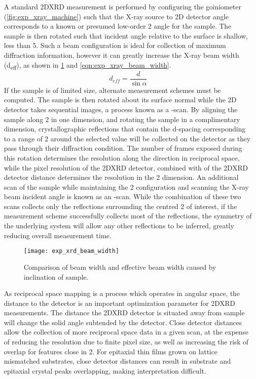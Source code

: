 A standard 2DXRD measurement is performed by configuring the goiniometer (\cref{fig:exp_xray_machine}) such that the X-ray source to 2D detector angle corresponds to a known or presumed low-order 2\straighttheta{} angle for the sample.
The sample is then rotated such that incident angle relative to the surface is shallow, less than 5\degree{}.
Such a beam configuration is ideal for collection of maximum diffraction information, however it can greatly increase the X-ray beam width (d\textsubscript{eff}), as shown in \cref{fig:exp_xray_beam_width} and \cref{eqn:exp_xray_beam_width}.
\begin{equation}
d_{eff} = \frac{d}{\sin{\alpha}} \label{eqn:exp_xray_beam_width}
\end{equation}
If the sample is of limited size, alternate measurement schemes must be computed.
The sample is then rotated about its surface normal while the 2D detector takes sequential images, a process known as a \textphi{}-scan.
By aligning the sample along 2\straighttheta{} in one dimension, and rotating the sample in a complimentary dimension, crystallographic reflections that contain the d-spacing corresponding to a range of 2\straighttheta{} around the selected value will be collected on the detector as they pass through their diffraction condition.
The number of frames exposed during this rotation determines the resolution along the \textchi direction in reciprocal space, while the pixel resolution of the 2DXRD detector, combined with of the 2DXRD detector distance determines the resolution in the 2\straighttheta{} dimension.
An additional scan of the sample while maintaining the 2\straighttheta{} configuration and scanning the X-ray beam incident angle is known as an \textomega{}-scan.
While the combination of these two scans collects only the reflections surrounding the centred 2\straighttheta{} of interest, if the measurement scheme successfully collects most of the reflections, the symmetry of the underlying system will allow any other reflections to be inferred, greatly reducing overall measurement time.
\begin{figure}
 \centering \texttt{[image: exp\_xrd\_beam\_width]}
 \caption[X-Ray Beam Width]{\label{fig:exp_xray_beam_width}Comparison of beam width and effective beam width caused by inclination of sample.}
\end{figure}


As reciprocal space mapping is a process which operates in angular space, the distance to the detector is an important optimization parameter for 2DXRD measurements.
The distance the 2DXRD detector is situated away from sample will change the solid angle subtended by the detector.
Close detector distances allow the collection of more reciprocal space data in a given scan, at the expense of reducing the resolution due to finite pixel size, as well as increasing the risk of overlap for features close in 2\straighttheta{}.
For epitaxial thin films grown on lattice mismatched substrates, close detector distances can result in substrate and epitaxial crystal peaks overlapping, making interpretation difficult.

